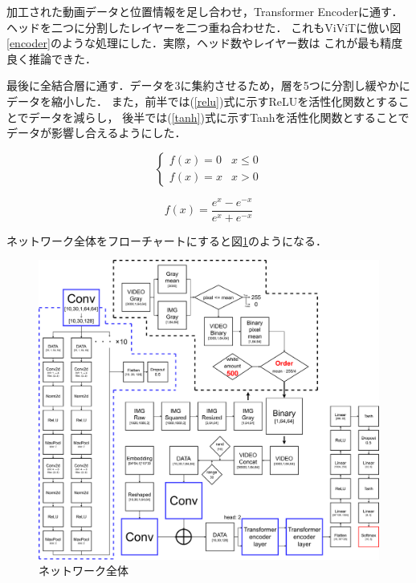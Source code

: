 加工された動画データと位置情報を足し合わせ，Transformer Encoderに通す．
ヘッドを二つに分割したレイヤーを二つ重ね合わせた．
これもViViTに倣い図\ref{encoder}のような処理にした．実際，ヘッド数やレイヤー数は
これが最も精度良く推論できた．

最後に全結合層に通す．データを3に集約させるため，層を5つに分割し緩やかにデータを縮小した．
また，前半では(\ref{relu})式に示すReLUを活性化関数とすることでデータを減らし，
後半では(\ref{tanh})式に示すTanhを活性化関数とすることでデータが影響し合えるようにした．

\begin{equation}
  \left\{
    \begin{array}{ll}
      f(x) = 0 & x \leq 0 \\
      f(x) = x & x > 0
    \end{array}
  \right.
  \label{relu}
\end{equation}

\begin{equation}
  f(x) = \frac{e^x - e^{-x}}{e^x + e^{-x}}
  \label{tanh}
\end{equation}

ネットワーク全体をフローチャートにすると図\ref{flowchart}のようになる．

\begin{figure}[b]
  \begin{center}
    \includegraphics[width=130mm]{images/chart/flowchart.pdf}
  \end{center}
  \caption{ネットワーク全体}
  \label{flowchart}
\end{figure}
\clearpage

